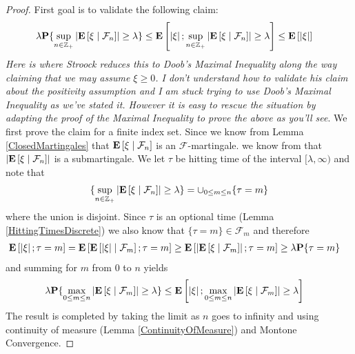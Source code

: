 \begin{proof}
First goal is to validate the following claim:
\begin{align*}
\lambda \textbf{P}\{\sup_{n \in \mathbb{Z}_+}
  \left \vert \textbf{E}\left[ \xi \mid \mathcal{F}_n \right] \right \vert \geq \lambda\} &\leq
\textbf{E}\left[ \left \vert \xi \right \vert ; \sup_{n \in \mathbb{Z}_+}
  \left \vert \textbf{E}\left[ \xi \mid \mathcal{F}_n \right] \right \vert \geq \lambda\right]  \leq \textbf{E}\left[\left \vert \xi \right \vert\right]
\end{align*}
\emph{Here is where Stroock reduces this to Doob's Maximal Inequality
  along the way claiming that we may assume $\xi \geq 0$.  I don't
  understand how to validate his claim about the positivity assumption
  and I am stuck trying to use
  Doob's Maximal Inequality as we've stated it. However it is easy to
  rescue the situation by adapting the proof of the
  Maximal Inequality to prove the above as you'll see}.
We first prove the claim for a finite index set.  Since we 
know from Lemma \ref{ClosedMartingales} that
$\textbf{E}\left[ \xi \mid \mathcal{F}_n \right]$ is an
$\mathcal{F}$-martingale. we know from
that $\left \vert \textbf{E}\left[ \xi \mid \mathcal{F}_n \right] \right \vert$ is a
submartingale.  We let $\tau$ be hitting time of the interval
$[\lambda, \infty)$ and note that 
\begin{align*}
\lbrace \sup_{n \in \mathbb{Z}_+}
  \left \vert \textbf{E}\left[ \xi \mid \mathcal{F}_n \right] \right \vert \geq \lambda \rbrace =
  \cup_{0 \leq m \leq n} \lbrace \tau = m \rbrace
\end{align*}
where the union is disjoint.  Since $\tau$ is an optional time
(Lemma \ref{HittingTimesDiscrete}) we also know that $\lbrace \tau =
m \rbrace \in \mathcal{F}_m$ and therefore
\begin{align*}
\textbf{E}\left[\left \vert \xi \right \vert ; \tau = m\right] &= 
\textbf{E}\left[\textbf{E}\left[ \left \vert \xi \right \vert \mid \mathcal{F}_m \right] ; \tau =  m\right] \geq 
\textbf{E}\left[\left \vert \textbf{E}\left[ \xi \mid \mathcal{F}_m \right] \right \vert ; \tau =  m\right]
\geq 
\lambda \textbf{P}\{\tau = m\}
\end{align*}
and summing for $m$ from 0 to $n$ yields
\begin{align*}
\lambda \textbf{P}\{\max_{0 \leq m \leq n}
  \left \vert \textbf{E}\left[ \xi \mid \mathcal{F}_m \right] \right \vert \geq \lambda\} &\leq
\textbf{E}\left[ \left \vert \xi \right \vert ; \max_{0 \leq m \leq n}
  \left \vert \textbf{E}\left[ \xi \mid \mathcal{F}_m \right] \right \vert \geq \lambda\right] 
\end{align*}
The result is completed by taking the limit as $n$ goes to infinity
and using continuity of measure (Lemma \ref{ContinuityOfMeasure}) and
Montone Convergence.


\end{proof}
